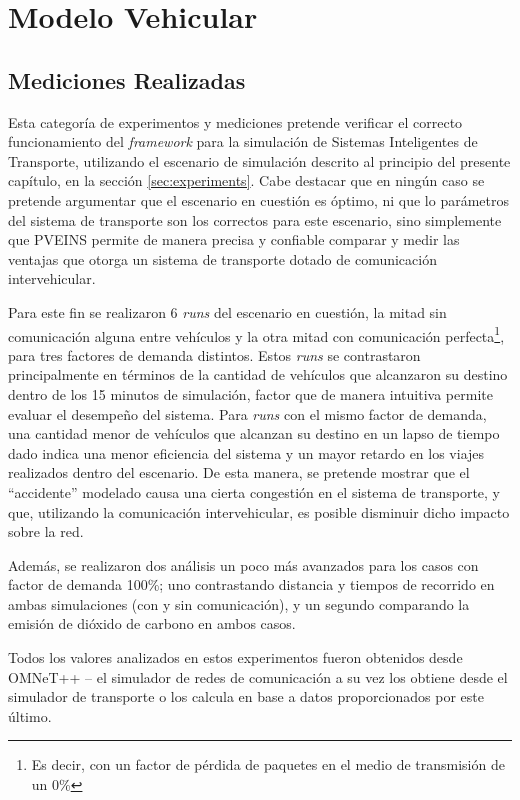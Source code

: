 \section{Modelo Vehicular}\label{sec:results:vehicular}

\subsection{Mediciones Realizadas}

Esta categoría de experimentos y mediciones pretende verificar el correcto funcionamiento del \emph{framework} para la simulación de Sistemas Inteligentes de Transporte, utilizando el escenario de simulación descrito al principio del presente capítulo, en la sección \ref{sec:experiments}. Cabe destacar que en ningún caso se pretende argumentar que el escenario en cuestión es óptimo, ni que lo parámetros del sistema de transporte son los correctos para este escenario, sino simplemente que PVEINS permite de manera precisa y confiable comparar y medir las ventajas que otorga un sistema de transporte dotado de comunicación intervehicular.

Para este fin se realizaron 6 \emph{runs} del escenario en cuestión, la mitad sin comunicación alguna entre vehículos y la otra mitad con comunicación perfecta\footnote{Es decir, con un factor de pérdida de paquetes en el medio de transmisión de un 0\%}, para tres factores de demanda distintos. Estos \emph{runs} se contrastaron principalmente en términos de la cantidad de vehículos que alcanzaron su destino dentro de los 15 minutos de simulación, factor que de manera intuitiva permite evaluar el desempeño del sistema. Para \emph{runs} con el mismo factor de demanda, una cantidad menor de vehículos que alcanzan su destino en un lapso de tiempo dado indica una menor eficiencia del sistema y un mayor retardo en los viajes realizados dentro del escenario. De esta manera, se pretende mostrar que el ``accidente'' modelado causa una cierta congestión en el sistema de transporte, y que, utilizando la comunicación intervehicular, es posible disminuir dicho impacto sobre la red. 

Además, se realizaron dos análisis un poco más avanzados para los casos con factor de demanda 100\%; uno contrastando distancia y tiempos de recorrido en ambas simulaciones (con y sin comunicación), y un segundo comparando la emisión de dióxido de carbono en ambos casos. 

Todos los valores analizados en estos experimentos fueron obtenidos desde OMNeT++ -- el simulador de redes de comunicación a su vez los obtiene desde el simulador de transporte o los calcula en base a datos proporcionados por este último. 

